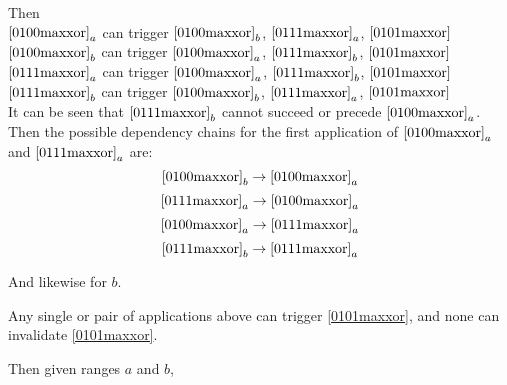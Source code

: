 \documentclass{article}
\begin{document}
Then\\
$\eqref{0100maxxor}_a$ \quad can trigger \quad $\eqref{0100maxxor}_b$,
$\eqref{0111maxxor}_a$, $\eqref{0101maxxor}$\\
$\eqref{0100maxxor}_b$ \quad can trigger \quad $\eqref{0100maxxor}_a$,
$\eqref{0111maxxor}_b$, $\eqref{0101maxxor}$\\
$\eqref{0111maxxor}_a$ \quad can trigger \quad $\eqref{0100maxxor}_a$,
$\eqref{0111maxxor}_b$, $\eqref{0101maxxor}$\\
$\eqref{0111maxxor}_b$ \quad can trigger \quad $\eqref{0100maxxor}_b$,
$\eqref{0111maxxor}_a$, $\eqref{0101maxxor}$\\

It can be seen that $\eqref{0111maxxor}_b$ cannot succeed or precede
$\eqref{0100maxxor}_a$. 
Then the possible dependency chains for the first application of 
$\eqref{0100maxxor}_a$ and $\eqref{0111maxxor}_a$ are:
\begin{equation*} 
\eqref{0100maxxor}_b \rightarrow \eqref{0100maxxor}_a
\end{equation*}
\begin{equation*} 
\eqref{0111maxxor}_a \rightarrow \eqref{0100maxxor}_a
\end{equation*}
\begin{equation*} 
\eqref{0100maxxor}_a \rightarrow 
\eqref{0111maxxor}_a
\end{equation*}
\begin{equation*} 
\eqref{0111maxxor}_b \rightarrow 
\eqref{0111maxxor}_a
\end{equation*}

And likewise for $b$.

Any single or pair of applications above can trigger
\eqref{0101maxxor}, and none can invalidate 
\eqref{0101maxxor}.

\vspace{10pt}

Then given ranges $a$ and $b$,
\vspace{10pt}
\end{document}
